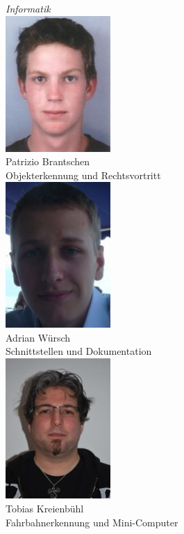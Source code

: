 \begin{minipage}{0.49\textwidth}
\begin{flushright} \large
\emph{Informatik}\\
\includegraphics[width=0.3\textwidth]{./04_Projektmanagement/fig/patriziobrantschen.jpg}\\
Patrizio Brantschen\\
Objekterkennung und Rechtsvortritt\\
\includegraphics[width=0.3\textwidth]{./04_Projektmanagement/fig/adrianwuersch.jpg}\\
Adrian Würsch\\
Schnittstellen und Dokumentation\\
\includegraphics[width=0.3\textwidth]{./04_Projektmanagement/fig/tobiaskreienbuehl.jpg}\\
Tobias Kreienbühl\\
Fahrbahnerkennung und Mini-Computer\\
\end{flushright}
\end{minipage}









